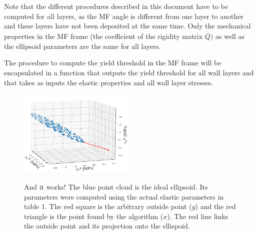 \documentclass[]{article}
\begin{document}
Note that the different procedures described in this document have to be computed for all layers, as the MF angle is different from one layer to another and these layers have not been deposited at the same time. Only the mechanical properties in the MF frame (the coefficient of the rigidity matrix $\overline{\overline{Q}})$ as well as  the ellipsoid parameters are the same for all layers. 

The procedure to compute the yield threshold in the MF frame will be encapsulated in a function that outputs the yield threshold for all wall layers and that takes as inputs the elastic properties and all wall layer stresses.

	\begin{figure}[h]
	\centering
	{\includegraphics[width=0.5\textwidth]{ellipsoid_result.png}}
	\caption{And it works! The blue point cloud is the ideal ellipsoid. Its parameters were computed using the actual elastic parameters in table 1. The red square is the arbitrary outside point ($y$) and the red triangle is the point found by the algorithm ($x$). The red line links the outside point and its projection onto the ellispoid. }
	\label{fig2}
\end{figure}

\end{document}
